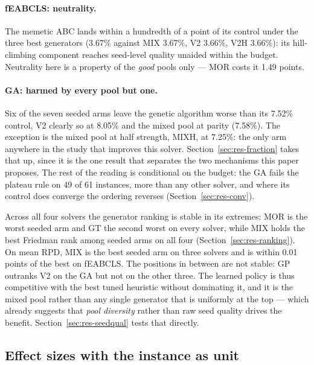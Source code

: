 \documentclass[review]{elsarticle}
\begin{document}
\paragraph{fEABCLS: neutrality.} The memetic ABC lands within a hundredth
of a point of its control under the three best generators (3.67\% against
MIX 3.67\%, V2 3.66\%, V2H 3.66\%): its hill-climbing component reaches
seed-level quality unaided within the budget. Neutrality here is a property
of the \emph{good} pools only --- MOR costs it 1.49 points.

\paragraph{GA: harmed by every pool but one.} Six of the seven seeded arms
leave the genetic algorithm worse than its 7.52\% control, V2 clearly so at
8.05\% and the mixed pool at parity (7.58\%). The exception is the mixed
pool at half strength, MIXH, at 7.25\%: the only arm anywhere in the study
that improves this solver. Section~\ref{sec:res-fraction} takes that up,
since it is the one result that separates the two mechanisms this paper
proposes. The rest of the reading is conditional on the budget: the GA
fails the plateau rule on 49 of 61 instances, more than any other solver,
and where its control does converge the ordering reverses
(Section~\ref{sec:res-conv}).

Across all four solvers the generator ranking is stable in its extremes:
MOR is the worst seeded arm and GT the second worst on every solver, while
MIX holds the best Friedman rank among seeded arms on all four
(Section~\ref{sec:res-ranking}). On mean RPD, MIX is the best seeded arm on
three solvers and is within 0.01 points of the best on fEABCLS. The
positions in between are not stable: GP outranks V2 on the GA but not on
the other three. The learned policy is thus competitive with the best tuned
heuristic without dominating it, and it is the mixed pool rather than any
single generator that is uniformly at the top --- which already suggests
that \emph{pool diversity} rather than raw seed quality drives the benefit.
Section~\ref{sec:res-seedqual} tests that directly.

\subsection{Effect sizes with the instance as unit}\label{sec:res-ic}
\end{document}
